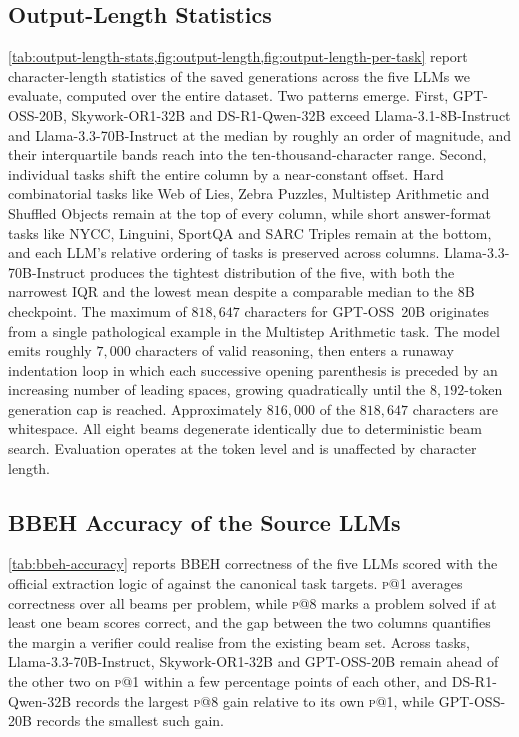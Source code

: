 

\subsection{Output-Length Statistics}
\label{appendix:output_length}

\cref{tab:output-length-stats,fig:output-length,fig:output-length-per-task}
report character-length statistics of the saved generations across the
five LLMs we evaluate, computed over the entire dataset. Two patterns
emerge. First, GPT-OSS-20B, Skywork-OR1-32B and DS-R1-Qwen-32B exceed
Llama-3.1-8B-Instruct and Llama-3.3-70B-Instruct at the median by
roughly an order of magnitude, and their interquartile bands reach into
the ten-thousand-character range. Second, individual tasks shift the
entire column by a near-constant offset. Hard combinatorial tasks like
Web of Lies, Zebra Puzzles, Multistep Arithmetic and Shuffled Objects
remain at the top of every column, while short answer-format tasks like
NYCC, Linguini, SportQA and SARC Triples remain at the bottom, and
each LLM's relative ordering of tasks is preserved across columns.
Llama-3.3-70B-Instruct produces the tightest distribution of the five,
with both the narrowest IQR and the lowest mean despite a comparable
median to the 8B checkpoint.
The maximum of $818{,}647$ characters for GPT-OSS~20B originates from a single pathological example in the Multistep Arithmetic task. The model emits roughly $7{,}000$ characters of valid reasoning, then enters a runaway indentation loop in which each successive opening parenthesis is preceded by an increasing number of leading spaces, growing quadratically until the $8{,}192$-token generation cap is reached. Approximately $816{,}000$ of the $818{,}647$ characters are whitespace. All eight beams degenerate identically due to deterministic beam search. Evaluation operates at the token level and is unaffected by character length.





\subsection{BBEH Accuracy of the Source LLMs}
\label{appendix:bbeh_accuracy}

\cref{tab:bbeh-accuracy} reports BBEH correctness of the five LLMs
scored with the official extraction logic of
\citet{kazemi2025bigbenchextrahard} against the canonical task
targets. \textsc{p@1} averages correctness over all beams per problem,
while \textsc{p@8} marks a problem solved if at least one beam scores
correct, and the gap between the two columns quantifies the margin a
verifier could realise from the existing beam set. Across tasks,
Llama-3.3-70B-Instruct, Skywork-OR1-32B and GPT-OSS-20B remain ahead
of the other two on \textsc{p@1} within a few percentage points of
each other, and DS-R1-Qwen-32B records the largest \textsc{p@8} gain
relative to its own \textsc{p@1}, while GPT-OSS-20B records the
smallest such gain.

